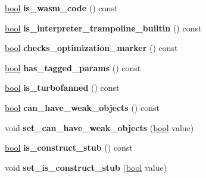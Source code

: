 \begin{DoxyCompactItemize}
\mbox{\label{classv8_1_1internal_1_1Code_a691e9ffecd18a537efcb04e98601c226}} 
\mbox{\hyperlink{classbool}{bool}} {\bfseries is\+\_\+wasm\+\_\+code} () const
\item 
\mbox{\label{classv8_1_1internal_1_1Code_a9f86800bcc197682342a2cd97b512edc}} 
\mbox{\hyperlink{classbool}{bool}} {\bfseries is\+\_\+interpreter\+\_\+trampoline\+\_\+builtin} () const
\item 
\mbox{\label{classv8_1_1internal_1_1Code_a60bd40175f2295d0b54e65882a5ab48b}} 
\mbox{\hyperlink{classbool}{bool}} {\bfseries checks\+\_\+optimization\+\_\+marker} () const
\item 
\mbox{\label{classv8_1_1internal_1_1Code_ae3538dbc89e4544c89f3c80cc41806f0}} 
\mbox{\hyperlink{classbool}{bool}} {\bfseries has\+\_\+tagged\+\_\+params} () const
\item 
\mbox{\label{classv8_1_1internal_1_1Code_a403968a7d293dc0f3720b881ef395d5a}} 
\mbox{\hyperlink{classbool}{bool}} {\bfseries is\+\_\+turbofanned} () const
\item 
\mbox{\label{classv8_1_1internal_1_1Code_afd7ddfd17c6cb2da7e340346a6de3d3c}} 
\mbox{\hyperlink{classbool}{bool}} {\bfseries can\+\_\+have\+\_\+weak\+\_\+objects} () const
\item 
\mbox{\label{classv8_1_1internal_1_1Code_af4c44e0a44573d0b8ff384bd89458052}} 
void {\bfseries set\+\_\+can\+\_\+have\+\_\+weak\+\_\+objects} (\mbox{\hyperlink{classbool}{bool}} value)
\item 
\mbox{\label{classv8_1_1internal_1_1Code_a4f5d17978d509679f7484114b56615be}} 
\mbox{\hyperlink{classbool}{bool}} {\bfseries is\+\_\+construct\+\_\+stub} () const
\item 
\mbox{\label{classv8_1_1internal_1_1Code_aaf0677a10eac08257c942b32f0625364}} 
void {\bfseries set\+\_\+is\+\_\+construct\+\_\+stub} (\mbox{\hyperlink{classbool}{bool}} value)
\item 

\end{DoxyCompactItemize}
